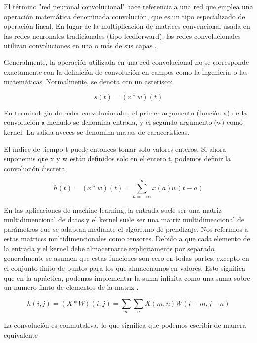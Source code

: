 	El término "red neuronal convolucional" hace referencia a una red que emplea una operación matemática denominada convolución, que es un tipo especializado de operación lineal. En lugar de la multiplicación de matrices convencional usada en las redes neuronales tradicionales (tipo feedforward), las redes convolucionales utilizan convoluciones en una o más de sus capas \parencite{Goodfellow-et-al-2016}.
	
	Generalmente, la operación utilizada en una red convolucional no se corresponde exactamente con la definición de convolución en campos como la ingeniería o las matemáticas. Normalmente, se denota con un asterisco:
	
	
	\begin{equation}
		\label{eq:cnn1}
		s(t) = (x * w)(t)
	\end{equation}
	
	En terminologia de redes convolucionales, el primer argumento (función x) de la convolución a menudo se denomina entrada, y el segundo argumento (w) como kernel. La salida aveces se denomina mapas de caraceristicas.
	
	El índice de tiempo t puede entonces tomar solo valores enteros. Si ahora suponemis que x y w están definidos solo en el entero t, podemos definir la convolución discreta.
	
	
	\begin{equation}
		\label{eq:cnn2}
		h(t) = (x * w)(t) = \sum_{a=-\infty}^{\infty} x(a) w(t - a)
	\end{equation}
	
	
	En las aplicaciones de machine learning, la entrada suele ser una matriz multidimencional de datos y el kernel suele ser una matriz multidimencional de parámetros que se adaptan mediante el algoritmo de prendizaje. Nos referimos a estas matrices multidimencionales como tensores. Debido a que cada elemento de la entrada y el kernel debe almacernarce explicitamente por separado, generalmente se asumen que estas funciones son cero en todas partes, excepto en el conjunto finito de puntos para los que almacenamos en valores. Esto significa que en la apráctica, podemos implementar la suma infinita como una suma sobre un numero finito de elementos de la matriz \parencite{Goodfellow-et-al-2016}. 
	
	
	\begin{equation}
		\label{eq:cnn3}
		h(i,j) = (X * W)(i,j) = \sum_{m} \sum_{n} X(m,n) W(i-m, j-n)
	\end{equation}
	
	La convolución es conmutativa, lo que significa que podemos escribir de manera equivalente
	
